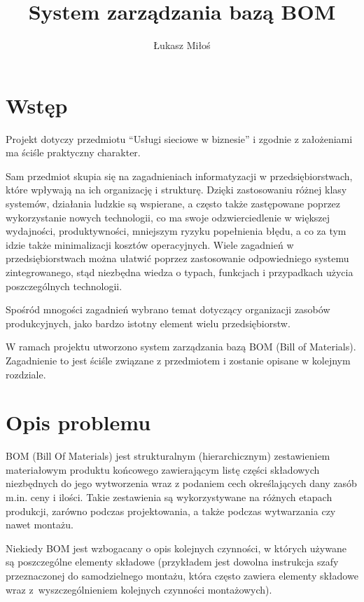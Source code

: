 \documentclass[12pt,twoside]{article}
\author{Łukasz Miłoś}
\title{System zarządzania bazą BOM}
\begin{document}
\maketitle
\blankpage

\tableofcontents
\clearpage
\blankpage

\section{Wstęp}
Projekt dotyczy przedmiotu \enquote{Usługi sieciowe w biznesie} i zgodnie z założeniami ma ściśle praktyczny charakter.

Sam przedmiot skupia się na zagadnieniach informatyzacji w przedsiębiorstwach, które wpływają na ich organizację i strukturę. Dzięki zastosowaniu różnej klasy systemów, działania ludzkie są wspierane, a często także zastępowane poprzez wykorzystanie nowych technologii, co ma swoje odzwierciedlenie w większej wydajności, produktywności, mniejszym ryzyku popełnienia błędu, a co za tym idzie także minimalizacji kosztów operacyjnych. Wiele zagadnień w przedsiębiorstwach można ułatwić poprzez zastosowanie odpowiedniego systemu zintegrowanego, stąd niezbędna wiedza o typach, funkcjach i przypadkach użycia poszczególnych technologii.

Spośród mnogości zagadnień wybrano temat dotyczący organizacji zasobów produkcyjnych, jako bardzo istotny element wielu przedsiębiorstw.

W ramach projektu utworzono system zarządzania bazą BOM (Bill of Materials). Zagadnienie to jest ściśle związane z przedmiotem i zostanie opisane w kolejnym rozdziale.

\clearpage

\section{Opis problemu}

BOM (Bill Of Materials) jest strukturalnym (hierarchicznym) zestawieniem materiałowym produktu końcowego zawierającym listę części składowych niezbędnych do jego wytworzenia wraz z podaniem cech określających dany zasób m.in. ceny i ilości. Takie zestawienia są wykorzystywane na różnych etapach produkcji, zarówno podczas projektowania, a także podczas wytwarzania czy nawet montażu.

Niekiedy BOM jest wzbogacany o opis kolejnych czynności, w których używane są poszczególne elementy składowe (przykładem jest dowolna instrukcja szafy przeznaczonej do samodzielnego montażu, która często zawiera elementy składowe wraz z~wyszczególnieniem kolejnych czynności montażowych).
\end{document}
